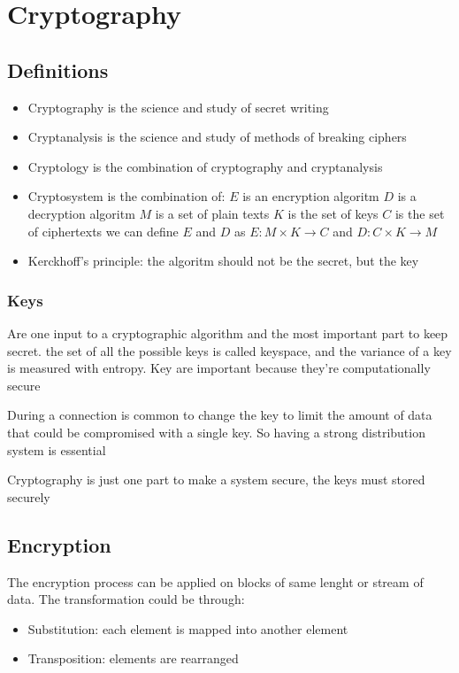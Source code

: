 \documentclass[12pt, a4paper]{article}
\begin{document}
\newpage
\section{Cryptography}
\subsection{Definitions}
\begin{itemize}
    \item Cryptography is the science and study of secret writing
    \item Cryptanalysis is the science and study of methods of breaking ciphers
    \item Cryptology is the combination of cryptography and cryptanalysis
    \item Cryptosystem is the combination of:
    \subitem $E$ is an encryption algoritm
    \subitem $D$ is a decryption algoritm
    \subitem $M$ is a set of plain texts
    \subitem $K$ is the set of keys
    \subitem $C$ is the set of ciphertexts
    \subsubitem we can define $E$ and $D$ as $E:M\times K\to C$ and $D:C\times K\to M$
    \item Kerckhoff's principle: the algoritm should not be the secret, but the key
\end{itemize}

\subsubsection{Keys}
Are one input to a cryptographic algorithm and the most important part to keep secret. the set of all the possible keys
is called keyspace, and the variance of a key is measured with entropy. Key are important because they're computationally
secure 

During a connection is common to change the key to limit the amount of data that could be compromised with a single key.
So having a strong distribution system is essential 

Cryptography is just one part to make a system secure, the keys must stored securely

\subsection{Encryption}
The encryption process can be applied on blocks of same lenght or stream of data. The transformation could be through:
\begin{itemize}
    \item Substitution: each element is mapped into another element
    \item Transposition: elements are rearranged
\end{itemize}
\end{document}
